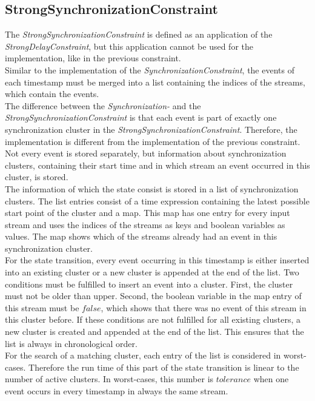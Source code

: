 \subsection{StrongSynchronizationConstraint}
	The \emph{StrongSynchronizationConstraint} is defined as an application of the \emph{StrongDelayConstraint}, but this application cannot be used for the implementation, like in the previous constraint.\\
	Similar to the implementation of the \emph{SynchronizationConstraint}, the events of each timestamp must be merged into a list containing the indices of the streams, which contain the events.\\
	The difference between the \emph{Synchronization-} and the \emph{StrongSynchronizationConstraint} is that each event is part of exactly one synchronization cluster in the \emph{StrongSynchronizationConstraint}. Therefore, the implementation is different from the implementation of the previous constraint. Not every event is stored separately, but information about synchronization clusters, containing their start time and in which stream an event occurred in this cluster, is stored.\\
	The information of which the state consist is stored in a list of synchronization clusters. The list entries consist of a time expression containing the latest possible start point of the cluster and a map. This map has one entry for every input stream and uses the indices of the streams as keys and boolean variables as values. The map shows which of the streams already had an event in this synchronization cluster.\\
	For the state transition, every event occurring in this timestamp is either inserted into an existing cluster or a new cluster is appended at the end of the list. Two conditions must be fulfilled to insert an event into a cluster. First, the cluster must not be older than upper. Second, the boolean variable in the map entry of this stream must be $false$, which shows that there was no event of this stream in this cluster before. If these conditions are not fulfilled for all existing clusters, a new cluster is created and appended at the end of the list. This ensures that the list is always in chronological order.\\
	For the search of a matching cluster, each entry of the list is considered in worst-cases. Therefore the run time of this part of the state transition is linear to the number of active clusters. In worst-cases, this number is $tolerance$ when one event occurs in every timestamp in always the same stream.\\

